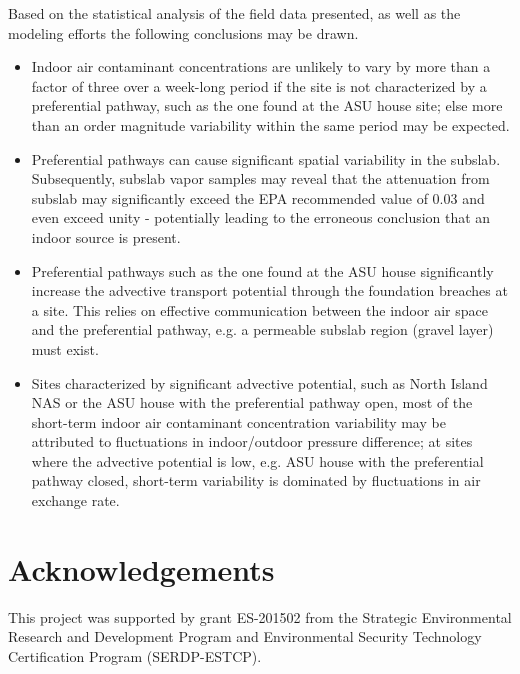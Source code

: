 \documentclass[preprint,12pt]{elsarticle}
\begin{document}
Based on the statistical analysis of the field data presented, as well as the modeling efforts the following conclusions may be drawn.
\begin{itemize}
  \item Indoor air contaminant concentrations are unlikely to vary by more than a factor of three over a week-long period if the site is not characterized by a preferential pathway, such as the one found at the ASU house site; else more than an order magnitude variability within the same period may be expected.
  \item Preferential pathways can cause significant spatial variability in the subslab. Subsequently, subslab vapor samples may reveal that the attenuation from subslab may significantly exceed the EPA recommended value of 0.03 and even exceed unity - potentially leading to the erroneous conclusion that an indoor source is present.
  \item Preferential pathways such as the one found at the ASU house significantly increase the advective transport potential through the foundation breaches at a site. This relies on effective communication between the indoor air space and the preferential pathway, e.g. a permeable subslab region (gravel layer) must exist.
  \item Sites characterized by significant advective potential, such as North Island NAS or the ASU house with the preferential pathway open, most of the short-term indoor air contaminant concentration variability may be attributed to fluctuations in indoor/outdoor pressure difference; at sites where the advective potential is low, e.g. ASU house with the preferential pathway closed, short-term variability is dominated by fluctuations in air exchange rate.
\end{itemize}


\section*{Acknowledgements}
This project was supported by grant ES-201502 from the Strategic Environmental Research and Development Program and Environmental Security Technology Certification Program (SERDP-ESTCP).
\end{document}
